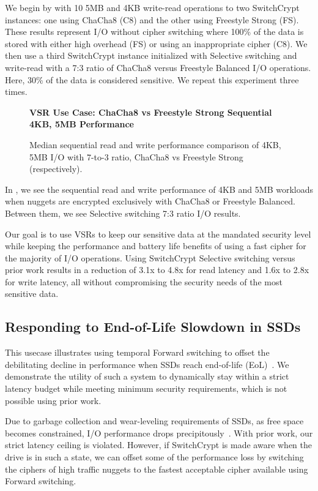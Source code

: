 We begin by with 10 5MB and 4KB write-read operations to two
SwitchCrypt instances: one using ChaCha8 (C8) and the other using Freestyle
Strong (FS). These results represent I/O without cipher switching where 100\% of
the data is stored with either high overhead (FS) or using an inappropriate
cipher (C8). We then use a third SwitchCrypt instance initialized with Selective
switching and write-read with a 7:3 ratio of ChaCha8 versus Freestyle
Balanced I/O operations. Here, 30\% of the data is considered sensitive. We
repeat this experiment three times.

\begin{figure}[ht] \textbf{VSR Use Case: ChaCha8 vs Freestyle Strong Sequential
4KB, 5MB Performance}\par\medskip
   \centering
   {} \caption{Median sequential read and write
   performance comparison of 4KB, 5MB I/O with 7-to-3 ratio, ChaCha8 vs
   Freestyle Strong (respectively).}
  \label{fig:usecase-vsr-bar}
\end{figure}

In , we see the sequential read and write performance of
4KB and 5MB workloads when nuggets are encrypted exclusively with ChaCha8 or
Freestyle Balanced. Between them, we see Selective switching 7:3 ratio I/O
results.

Our goal is to use VSRs to keep our sensitive data at the mandated security
level while keeping the performance and battery life benefits of using a fast
cipher for the majority of I/O operations. Using SwitchCrypt Selective switching
versus prior work results in a reduction of 3.1x to 4.8x for read latency and
1.6x to 2.8x for write latency, all without compromising the security needs of
the most sensitive data.

\subsection{Responding to End-of-Life Slowdown in SSDs} \label{subsec:uc3}

This usecase illustrates using temporal Forward switching to offset the
debilitating decline in performance when SSDs reach end-of-life
(EoL)~\cite{SSDEOL1}. We demonstrate the utility of such a system to dynamically
stay within a strict latency budget while meeting minimum security requirements,
which is not possible using prior work.

Due to garbage collection and wear-leveling requirements of SSDs, as free space
becomes constrained, I/O performance drops precipitously~\cite{SSDEOL1}. With
prior work, our strict latency ceiling is violated. However, if SwitchCrypt is
made aware when the drive is in such a state, we can offset some of the
performance loss by switching the ciphers of high traffic nuggets to the fastest
acceptable cipher available using Forward switching.

